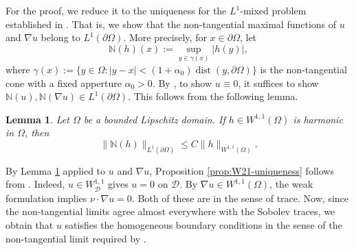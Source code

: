 \documentclass[12pt]{amsart}
\newtheorem{lemma}[theorem]{Lemma}
\numberwithin{equation}{section}
\newcommand\cD{\mathcal{D}}
\newcommand{\p}{\partial}
\begin{document}
For the proof, we reduce it to the uniqueness for the $L^1$-mixed problem established in \cite[Theorem~1.1(a)]{MR3034453}. That is, we show that the non-tangential maximal functions of $u$ and $\nabla u$ belong to $L^1(\partial\Omega)$.
More precisely, for $x\in\p\Omega$, let 
\[
 \mathbb{N}(h)(x):=\sup_{y\in\gamma(x)}|h(y)|,
\]
where $\gamma(x):=\{y \in \Omega: |y-x| < (1+\alpha_0) \operatorname{dist}(y,\p\Omega)\}$ is the non-tangential cone with a fixed apperture $\alpha_0 > 0$. By \cite[Theorem~1.1(a)]{MR3034453}, to show $u\equiv 0$, it suffices to show $\mathbb{N}(u) , \mathbb{N} (\nabla u) \in L^1(\p\Omega)$. This follows from the following lemma.
\begin{lemma}
 \label{lem:W11-nontangential}
 Let $\Omega$ be a bounded Lipschitz domain. If
 $h\in W^{1,1}(\Omega)$ is harmonic in $\Omega$, then
 \begin{equation}
  \|\mathbb{N}(h)\|_{L^1(\p\Omega)}
  \leq C\|h\|_{W^{1,1}(\Omega)}.
  \label{eq:W11-nontangential}
 \end{equation}
\end{lemma}

By Lemma \ref{lem:W11-nontangential} applied to $u$ and $\nabla u$, Proposition \ref{prop:W21-uniqueness} follows from \cite[Theorem~1.1(a)]{MR3034453}. Indeed, $u \in W^{1,1}_\cD$ gives $u = 0$ on $\cD$. By $\nabla u\in W^{1,1}(\Omega)$, the weak formulation implies $\nu\cdot\nabla u=0$. Both of these are in the sense of trace. Now, since the non-tangential limits agree almost everywhere with the Sobolev traces, we obtain that $u$ satisfies the homogeneous boundary conditions in the sense of the non-tangential limit required by \cite[Theorem~1.1(a)]{MR3034453}. 
\end{document}
